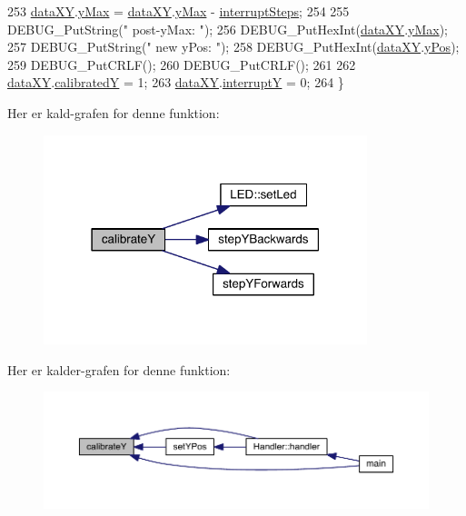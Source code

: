 \begin{DoxyCode}
253   \hyperlink{data_8h_a89d7998a721b3f36f9f4131e7a5e42d2}{dataXY}.\hyperlink{data_8h_ab979b62fb4882313ad47718325e34879}{yMax} = \hyperlink{data_8h_a89d7998a721b3f36f9f4131e7a5e42d2}{dataXY}.\hyperlink{data_8h_ab979b62fb4882313ad47718325e34879}{yMax} - \hyperlink{xy_8h_a319d8f8cbb816fc1ca2306587712b0b7}{interruptSteps};
254   
255   DEBUG\_PutString(\textcolor{stringliteral}{" post-yMax: "});
256   DEBUG\_PutHexInt(\hyperlink{data_8h_a89d7998a721b3f36f9f4131e7a5e42d2}{dataXY}.\hyperlink{data_8h_ab979b62fb4882313ad47718325e34879}{yMax});
257   DEBUG\_PutString(\textcolor{stringliteral}{" new yPos: "});
258   DEBUG\_PutHexInt(\hyperlink{data_8h_a89d7998a721b3f36f9f4131e7a5e42d2}{dataXY}.\hyperlink{data_8h_a4c7347df04ab0f3d860046571be08af4}{yPos});
259   DEBUG\_PutCRLF();
260   DEBUG\_PutCRLF();
261   
262   \hyperlink{data_8h_a89d7998a721b3f36f9f4131e7a5e42d2}{dataXY}.\hyperlink{data_8h_adebeaa27d72b604babe006a478cfed16}{calibratedY} = 1;
263   \hyperlink{data_8h_a89d7998a721b3f36f9f4131e7a5e42d2}{dataXY}.\hyperlink{data_8h_a0149ea97a32442280eb1c0b30c1eeaf1}{interruptY} = 0;
264 \}
\end{DoxyCode}


Her er kald-\/grafen for denne funktion\+:
\nopagebreak
\begin{figure}[H]
\begin{center}
\leavevmode
\includegraphics[width=267pt]{db/d87/class_x_y_a86751f168bdc352fa109644298829609_cgraph}
\end{center}
\end{figure}




Her er kalder-\/grafen for denne funktion\+:
\nopagebreak
\begin{figure}[H]
\begin{center}
\leavevmode
\includegraphics[width=350pt]{db/d87/class_x_y_a86751f168bdc352fa109644298829609_icgraph}
\end{center}
\end{figure}


